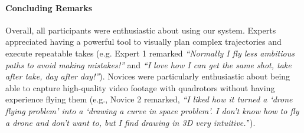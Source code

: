 \paragraph{Concluding Remarks}
Overall, all participants were enthusiastic about using our system.
Experts appreciated having a powerful tool to visually plan complex trajectories and execute repeatable takes (e.g. Expert 1 remarked \emph{``Normally I fly less ambitious paths to avoid making mistakes!''} and \emph{``I love how I can get the same shot, take after take, day after day!''}).
Novices were particularly enthusiastic about being able to capture high-quality video footage with quadrotors without having experience flying them (e.g., Novice 2 remarked, \emph{``I liked how it turned a `drone flying problem' into a `drawing a curve in space problem'. I don't know how to fly a drone and don't want to, but I find drawing in 3D very intuitive.'}').
